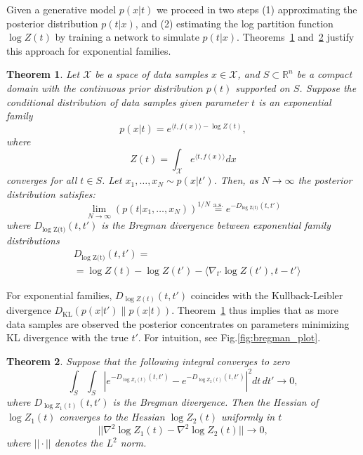 \documentclass{article}
\theoremstyle{plain}
\newtheorem{theorem}{Theorem}[section]
\theoremstyle{definition}
\theoremstyle{remark}
\begin{document}
Given a generative model $p(x|t)$ we proceed in two steps (1) approximating the posterior distribution $p(t|x)$, and (2) estimating the log partition function $\log Z(t)$ by training a network to simulate $p(t|x)$.
Theorems~\ref{theorem:main} and~\ref{theorem:convergence} justify this approach for exponential families.

\begin{theorem}
\label{theorem:main}
Let $ \mathcal{X} $ be a space of data samples $ x \in \mathcal{X} $, and $ S \subset \mathbb{R}^n $ be a compact domain with the continuous prior distribution $p(t)$ supported on $S$.
Suppose the conditional distribution of data samples given parameter $t$ is an exponential family
\begin{equation}
p(x|t) = e^{\langle t, f(x) \rangle - \log Z(t)},
\end{equation}
where 
\begin{equation}
Z(t) = \int_{\mathcal{X}} e^{\langle t, f(x) \rangle} dx
\end{equation}
converges for all $ t \in S $. Let $ x_1, \ldots, x_N \sim p(x|t') $. Then, as $N\to\infty$ the posterior distribution satisfies:
\begin{equation}
 \lim_{N \to \infty} \left(p(t|x_1, \ldots, x_N)\right)^{1/N} \overset{\text{a.s.}}{=} e^{-D_\text{log Z(t)}(t, t')}
\end{equation}
where $D_\text{log Z(t)}(t, t')$ is the Bregman divergence between exponential family distributions
\begin{equation}
    \begin{split}
        &D_\text{log Z(t)}(t, t') = \\&= \log Z(t) - \log Z(t') - \langle \nabla_{t'} \log Z(t'), t - t'  \rangle
    \end{split}
\end{equation}
\end{theorem}

For exponential families, $D_{\log Z(t)}(t, t')$ coincides with the Kullback-Leibler divergence $D_\text{KL}(p(x|t') \| p(x|t))$. Theorem~\ref{theorem:main} thus implies that as more data samples are observed the posterior concentrates on parameters minimizing KL divergence with the true $t'$. For intuition, see Fig.\ref{fig:bregman_plot}.

\begin{theorem}
\label{theorem:convergence}
Suppose that the following integral converges to zero
\begin{equation}
\int_{S} \int_{S} \left| e^{-D_{\log Z_{1}(t)}(t,t')} - e^{-D_{\log Z_{2}(t)}(t,t')} \right|^{2} dt \, dt' \to 0,
\label{eq:loss_convex_mse}
\end{equation}
where 
$D_{\log Z_{1}(t)}(t,t')$ is the Bregman divergence. Then the Hessian of $\log Z_{1}(t)$ converges to the Hessian $\log Z_{2}(t)$  uniformly in $t$
\begin{equation}
    || \nabla^{2}\log Z_{1}(t) - \nabla^{2}\log Z_{2}(t) || \to 0,
\end{equation}
where $||\cdot||$ denotes the $L^2$ norm.
\end{theorem}
\end{document}
